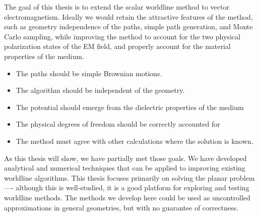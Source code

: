 The goal of this thesis is to extend the scalar worldline method to vector electromagnetism.
Ideally we would retain the attractive features of the method, such as geometry independence of the paths,
simple path generation, and Monte Carlo sampling, while improving the method to account for the two physical polarization
states of the EM field, and properly account for the material properties of the medium.  
\begin{itemize}
  \item The paths should be simple Brownian motions.
  \item The algorithm should be independent of the geometry.
  \item The potential should emerge from the dielectric properties of the medium
  \item The physical degrees of freedom should be correctly accounted for
  \item The method must agree with other calculations where the solution is known.    
\end{itemize}
As this thesis will show, we have partially met those goals.  We have developed analytical
and numerical techniques that can be applied to improving existing worldline algorithms.
This thesis focuses primarily on solving the planar problem ---- although this is well-studied,
it is a good platform for exploring and testing worldline methods.  
The methods we develop here could be used as uncontrolled approximations in general geometries, but with
no guarantee of correctness.  

